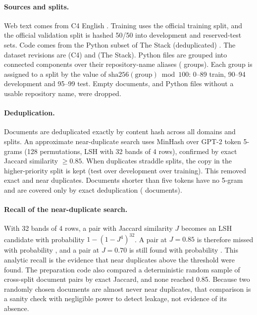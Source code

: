 \documentclass[11pt]{article}
\begin{document}
\paragraph{Sources and splits.} Web text comes from C4 English \citep{raffel2020t5}. Training uses the official
training split, and the official validation split is hashed 50/50 into development and reserved-test sets. Code
comes from the Python subset of The Stack (deduplicated) \citep{kocetkov2022stack}. The dataset revisions are
\texttt{\cfourRev} (C4) and \texttt{\stackRev} (The Stack). Python files are grouped into connected components
over their repository-name aliases (\repoGroups{} groups). Each group is assigned to a split by the value of
$\mathrm{sha256}(\text{group}) \bmod 100$: 0--89 train, 90--94 development and 95--99 test. Empty documents, and
Python files without a usable repository name, were dropped.

\paragraph{Deduplication.} Documents are deduplicated exactly by content hash across all domains and splits. An
approximate near-duplicate search uses MinHash \citep{broder1997resemblance} over GPT-2 token 5-grams (128
permutations, LSH with 32 bands of 4 rows), confirmed by exact Jaccard similarity $\ge 0.85$. When duplicates
straddle splits, the copy in the higher-priority split is kept (test over development over training). This
removed \exactRemoved{} exact and \nearRemoved{} near duplicates. Documents shorter than five tokens have no
5-gram and are covered only by exact deduplication (\shortDocs{} documents).

\paragraph{Recall of the near-duplicate search.} With 32 bands of 4 rows, a pair with Jaccard similarity $J$
becomes an LSH candidate with probability $1 - (1 - J^4)^{32}$. A pair at $J = 0.85$ is therefore missed with
probability \lshMiss, and a pair at $J = 0.70$ is still found with probability \lshRecallSeventy. This analytic
recall is the evidence that near duplicates above the threshold were found. The preparation code also compared
a deterministic random sample of \auditPairs{} cross-split document pairs by exact Jaccard, and none reached 0.85.
Because two randomly chosen documents are almost never near duplicates, that comparison is a sanity check with
negligible power to detect leakage, not evidence of its absence.
\end{document}

